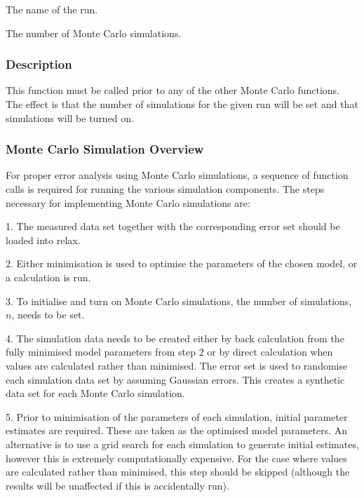    The name of the run.   

   The number of Monte Carlo simulations.  

  

  
 \subsubsection{Description} 

 This function must be called prior to any of the other Monte Carlo functions.  The effect is that the number of simulations for the given run will be set and that simulations will be turned on. 
  

  
 \subsubsection{Monte Carlo Simulation Overview} 

 For proper error analysis using Monte Carlo simulations, a sequence of function calls is required for running the various simulation components.  The steps necessary for implementing Monte Carlo simulations are: 
  

 1.  The measured data set together with the corresponding error set should be loaded into relax. 
  

 2.  Either minimisation is used to optimise the parameters of the chosen model, or a calculation is run. 
  

 3.  To initialise and turn on Monte Carlo simulations, the number of simulations, $n$, needs to be set. 
  

 4.  The simulation data needs to be created either by back calculation from the fully minimised model parameters from step 2 or by direct calculation when values are calculated rather than minimised.  The error set is used to randomise each simulation data set by assuming Gaussian errors.  This creates a synthetic data set for each Monte Carlo simulation. 
  

 5.  Prior to minimisation of the parameters of each simulation, initial parameter estimates are required.  These are taken as the optimised model parameters.  An alternative is to use a grid search for each simulation to generate initial estimates, however this is extremely computationally expensive.  For the case where values are calculated rather than minimised, this step should be skipped (although the results will be unaffected if this is accidentally run). 
  

